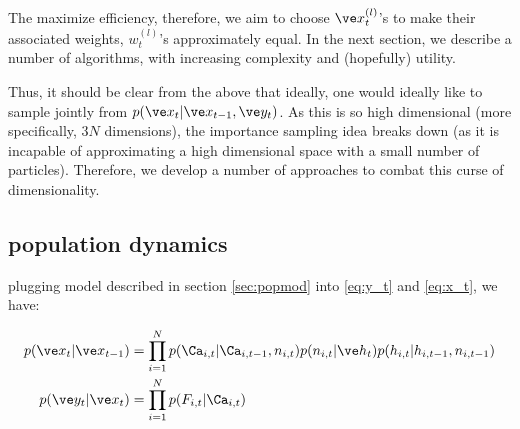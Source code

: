 The maximize efficiency, therefore, we aim to choose $\x_t^{(l)}$'s to make their associated weights, $w_t^{(l)}$'s approximately equal. In the next section, we describe a number of algorithms, with increasing complexity and (hopefully) utility. 

Thus, it should be clear from the above that ideally, one would ideally like to sample jointly from $p(\x_t | \x_{t-1}, \y_t)$.  As this is so high dimensional (more specifically, $3N$ dimensions), the importance sampling idea breaks down (as it is incapable of approximating a high dimensional space with a small number of particles).  Therefore, we develop a number of approaches to combat this curse of dimensionality.


%
%
%
%

\subsection{population dynamics}

plugging model described in section \ref{sec:popmod} into \eqref{eq:y_t} and \eqref{eq:x_t}, we have:

\begin{align}
p(\x_t | \x_{t-1}) &= \prod_{i=1}^N p(\Ca_{i,t} | \Ca_{i,t-1}, n_{i,t}) p(n_{i,t} | \h_t) p(h_{i,t} | h_{i,t-1}, n_{i,t-1})\\
p(\y_t | \x_t) &= \prod_{i=1}^N p(F_{i,t} | \Ca_{i,t})
\end{align}

